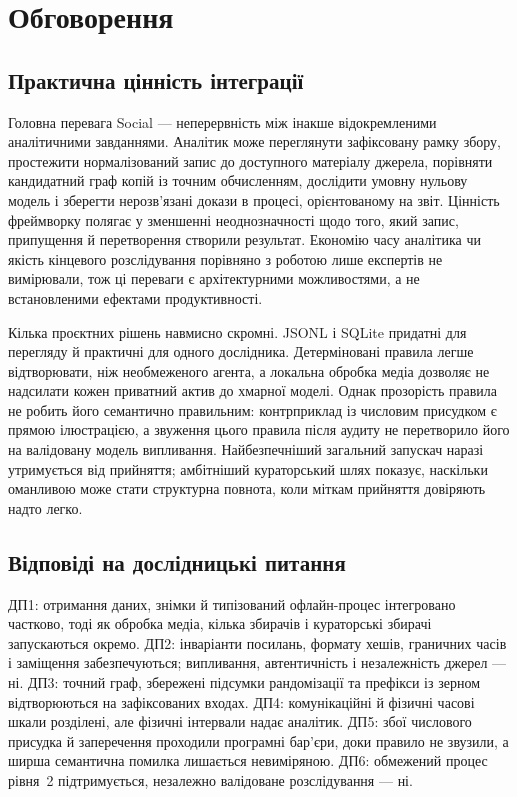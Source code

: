 \section{Обговорення}
\subsection{Практична цінність інтеграції}
Головна перевага Social --- неперервність між інакше відокремленими аналітичними завданнями. Аналітик може переглянути зафіксовану рамку збору, простежити нормалізований запис до доступного матеріалу джерела, порівняти кандидатний граф копій із точним обчисленням, дослідити умовну нульову модель і зберегти нерозв'язані докази в процесі, орієнтованому на звіт. Цінність фреймворку полягає у зменшенні неоднозначності щодо того, який запис, припущення й перетворення створили результат. Економію часу аналітика чи якість кінцевого розслідування порівняно з роботою лише експертів не вимірювали, тож ці переваги є архітектурними можливостями, а не встановленими ефектами продуктивності.

Кілька проєктних рішень навмисно скромні. JSONL і SQLite придатні для перегляду й практичні для одного дослідника. Детерміновані правила легше відтворювати, ніж необмеженого агента, а локальна обробка медіа дозволяє не надсилати кожен приватний актив до хмарної моделі. Однак прозорість правила не робить його семантично правильним: контрприклад із числовим присудком є прямою ілюстрацією, а звуження цього правила після аудиту не перетворило його на валідовану модель випливання. Найбезпечніший загальний запускач наразі утримується від прийняття; амбітніший кураторський шлях показує, наскільки оманливою може стати структурна повнота, коли міткам прийняття довіряють надто легко.

\subsection{Відповіді на дослідницькі питання}
ДП1: отримання даних, знімки й типізований офлайн-процес інтегровано частково, тоді як обробка медіа, кілька збирачів і кураторські збирачі запускаються окремо. ДП2: інваріанти посилань, формату хешів, граничних часів і заміщення забезпечуються; випливання, автентичність і незалежність джерел --- ні. ДП3: точний граф, збережені підсумки рандомізації та префікси із зерном відтворюються на зафіксованих входах. ДП4: комунікаційні й фізичні часові шкали розділені, але фізичні інтервали надає аналітик. ДП5: збої числового присудка й заперечення проходили програмні бар'єри, доки правило не звузили, а ширша семантична помилка лишається невиміряною. ДП6: обмежений процес рівня~2 підтримується, незалежно валідоване розслідування --- ні.

